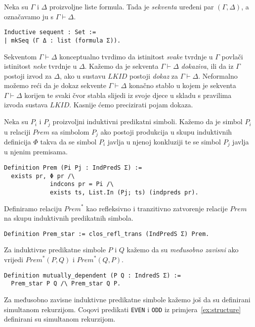 \begin{definition}
  Neka su \(\Gamma\) i \(\Delta\) proizvoljne liste formula.
  Tada je \textit{sekventa} uređeni par \((\Gamma,\Delta)\), a označavamo ju s \(\Gamma \vdash \Delta\).
\begin{verbatim}
Inductive sequent : Set :=
| mkSeq (Γ Δ : list (formula Σ)).
\end{verbatim}
\end{definition}
\noindent Sekventom \(\Gamma \vdash \Delta\) konceptualno tvrdimo da istinitost \textit{svake}
tvrdnje u \(\Gamma\) povlači istinitost \textit{neke} tvrdnje u \(\Delta\).
Kažemo da je sekventa \(\Gamma \vdash \Delta\) \textit{dokaziva}, ili da iz \(\Gamma\) postoji izvod za \(\Delta\), ako u sustavu \(\mathit{LKID}\) postoji \textit{dokaz} za \(\Gamma \vdash \Delta\).
Neformalno možemo reći da je dokaz sekvente \(\Gamma \vdash \Delta\) konačno stablo u kojem je sekventa \(\Gamma \vdash \Delta\) korijen
te svaki čvor stabla slijedi iz svoje djece u skladu s pravilima izvoda sustava \(\mathit{LKID}\).
Kasnije ćemo precizirati pojam dokaza.

\begin{definition}
  Neka su \(P_{i}\) i \(P_{j}\) proizvoljni induktivni predikatni simboli.
  Kažemo da je simbol \(P_{i}\) u relaciji \(\mathit{Prem}\) sa simbolom \(P_{j}\)
  ako postoji produkcija u skupu induktivnih definicija \(\Phi\) takva da
  se simbol \(P_{i}\) javlja u njenoj konkluziji te
  se simbol \(P_{j}\) javlja u njenim premisama.
\begin{verbatim}
Definition Prem (Pi Pj : IndPredS Σ) :=
  exists pr, Φ pr /\
             indcons pr = Pi /\
             exists ts, List.In (Pj; ts) (indpreds pr).
\end{verbatim}
\end{definition}

\begin{definition}
  Definiramo relaciju \(\mathit{Prem}^{\ast}\) kao refleksivno i tranzitivno zatvorenje relacije \(\mathit{Prem}\) na skupu induktivnih predikatnih simbola.
\begin{verbatim}
Definition Prem_star := clos_refl_trans (IndPredS Σ) Prem.
\end{verbatim}
  \noindent Za induktivne predikatne simbole \(P\) i \(Q\) kažemo da su
  \textit{međusobno zavisni} ako vrijedi \(\mathit{Prem}^{\ast}(P, Q)\) i \(\mathit{Prem}^{\ast}(Q, P)\).
\begin{verbatim}
Definition mutually_dependent (P Q : IndredS Σ) :=
  Prem_star P Q /\ Prem_star Q P.
\end{verbatim}
  \noindent Za međusobno zavisne induktivne predikatne simbole kažemo još da su
  definirani simultanom rekurzijom.
  Coqovi predikati \texttt{EVEN} i \texttt{ODD} iz primjera~\ref{ex:structure}
  definirani su simultanom rekurzijom.
\end{definition}

